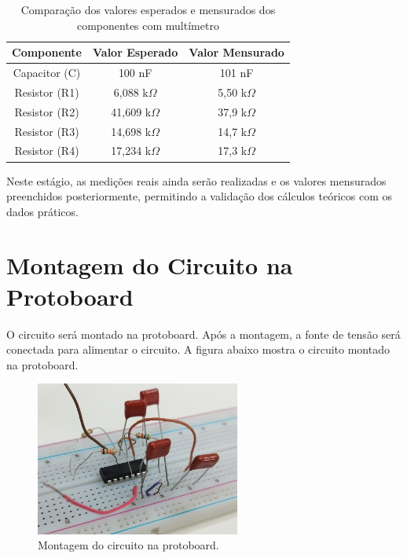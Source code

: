 \documentclass[
	12pt,				%
	openright,			%
	twoside,			%
	a4paper,			%
	english,			%
	french,				%
	spanish,			%
	brazil,				%
	]{abntex2}
\begin{document}
\begin{table}[H]
    \small
    \scriptsize
    \centering
    \begin{tabular}{|c|c|c|}
        \hline
        Componente & Valor Esperado & Valor Mensurado \\
        \hline
        Capacitor (C) & 100 nF & 101 nF \\
        Resistor (R1) & 6,088 k\(\Omega\) & 5,50 k\(\Omega\) \\
        Resistor (R2) & 41,609 k\(\Omega\) & 37,9 k\(\Omega\) \\
        Resistor (R3) & 14,698 k\(\Omega\) & 14,7 k\(\Omega\) \\
        Resistor (R4) & 17,234 k\(\Omega\) & 17,3 k\(\Omega\) \\
        \hline
    \end{tabular}
    \caption{Comparação dos valores esperados e mensurados dos componentes com multímetro \cite{keysight-u1250}}
    \label{tab:component_values}
\end{table}

Neste estágio, as medições reais ainda serão realizadas e os valores mensurados preenchidos posteriormente, permitindo a validação dos cálculos teóricos com os dados práticos.

\section{Montagem do Circuito na Protoboard}

O circuito será montado na protoboard. Após a montagem, a fonte de tensão será conectada para alimentar o circuito. A figura abaixo mostra o circuito montado na protoboard.

\begin{figure}[H]
    \centering
    \includegraphics[width=0.6\textwidth]{imgs/circuito_protoboard.jpg}
    \caption{Montagem do circuito na protoboard.}
    \label{fig:circuito_protoboard}
\end{figure}
\end{document}
